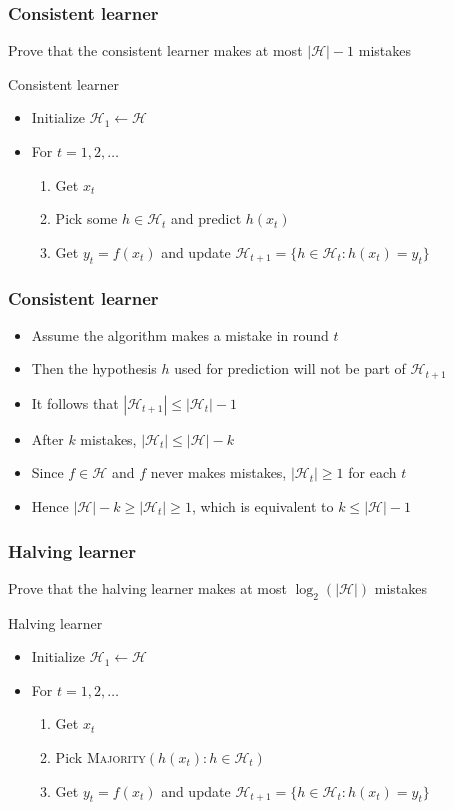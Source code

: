 \documentclass[10pt]{beamer}
\begin{document}
\begin{frame}
  \frametitle{Consistent learner}
  Prove that the consistent learner makes at most $|\mathcal{H}|-1$ mistakes
  \begin{block}{Consistent learner}
	\begin{itemize}
	\item Initialize $\mathcal{H}_1 \gets \mathcal{H}$
	\item For $t=1,2,\ldots$
	\begin{enumerate}
	\item Get $x_t$
	\item Pick some $h\in\mathcal{H}_t$ and predict $h(x_t)$
	\item Get $y_t=f(x_t)$ and update $\mathcal{H}_{t+1}=\{h\in\mathcal{H}_t:h(x_t)=y_t\}$
	\end{enumerate}
	\end{itemize}
  \end{block}
\end{frame}

\begin{frame}
  \frametitle{Consistent learner}
  \begin{itemize}
	\item Assume the algorithm makes a mistake in round $t$
	\pause
	\item Then the hypothesis $h$ used for prediction will {\color{red} not} be part of $\mathcal{H}_{t+1}$
	\pause
	\item It follows that $|\mathcal{H}_{t+1}|\leq|\mathcal{H}_t|-1$
	\pause
	\item After $k$ mistakes, $|\mathcal{H}_t| \leq |\mathcal{H}| - k$
	\pause
	\item Since $f\in\mathcal{H}$ and $f$ never makes mistakes, $|\mathcal{H}_t|\geq 1$ for each $t$
	\pause
	\item Hence $|\mathcal{H}| - k \geq |\mathcal{H}_t| \geq 1$, which is equivalent to $k \leq |\mathcal{H}| - 1$
  \end{itemize}
\end{frame}

\begin{frame}
  \frametitle{Halving learner}
  Prove that the halving learner makes at most $\log_2(|\mathcal{H}|)$ mistakes
  \begin{block}{Halving learner}
	\begin{itemize}
	\item Initialize $\mathcal{H}_1 \gets \mathcal{H}$
	\item For $t=1,2,\ldots$
	\begin{enumerate}
	\item Get $x_t$
	\item Pick \textsc{Majority}$(h(x_t):h\in\mathcal{H}_t)$
	\item Get $y_t=f(x_t)$ and update $\mathcal{H}_{t+1}=\{h\in\mathcal{H}_t:h(x_t)=y_t\}$
	\end{enumerate}
	\end{itemize}
  \end{block}
\end{frame}
\end{document}
